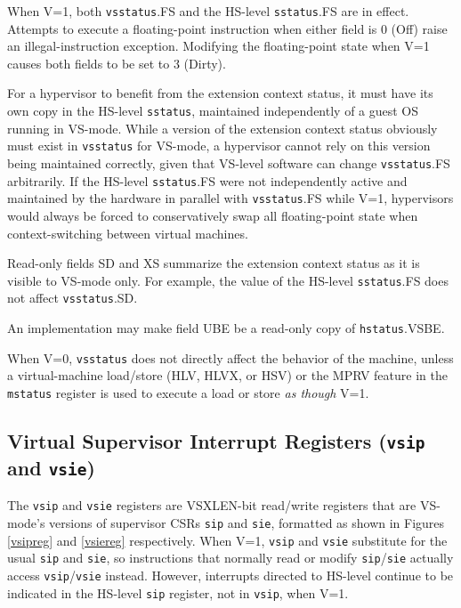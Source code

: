 When V=1, both {\tt vsstatus}.FS and the HS-level {\tt sstatus}.FS are in
effect.  Attempts
to execute a floating-point instruction when either field is 0 (Off) raise an
illegal-instruction exception.  Modifying the floating-point state when V=1
causes both fields to be set to 3 (Dirty).

\begin{commentary}
For a hypervisor to benefit from the extension context status, it must
have its own copy in the HS-level {\tt sstatus}, maintained independently
of a guest OS running in VS-mode.
While a version of the extension context status obviously must exist in
{\tt vsstatus} for VS-mode, a hypervisor cannot rely on this version
being maintained correctly, given that VS-level software can change
{\tt vsstatus}.FS arbitrarily.
If the HS-level {\tt sstatus}.FS were not independently active and
maintained by the hardware in parallel with {\tt vsstatus}.FS while V=1,
hypervisors would always be forced to conservatively swap all
floating-point state when context-switching between virtual machines.
\end{commentary}

Read-only fields SD and XS summarize the extension context status as it
is visible to VS-mode only.
For example, the value of the HS-level {\tt sstatus}.FS does not affect
{\tt vsstatus}.SD.

An implementation may make field UBE be a read-only copy of
{\tt hstatus}.VSBE.

When V=0, {\tt vsstatus} does not directly affect the behavior of the machine,
unless a virtual-machine load/store (HLV, HLVX, or HSV)
or the MPRV feature in the {\tt mstatus}
register is used to execute a load or store
{\em as though} V=1.

\subsection{Virtual Supervisor Interrupt Registers ({\tt vsip} and {\tt vsie})}

The {\tt vsip} and {\tt vsie} registers are VSXLEN-bit read/write
registers that are VS-mode's versions of supervisor CSRs {\tt sip} and
{\tt sie}, formatted as shown in Figures \ref{vsipreg} and \ref{vsiereg}
respectively.
When V=1, {\tt vsip} and {\tt vsie} substitute for the usual {\tt sip}
and {\tt sie}, so instructions that normally read or modify
{\tt sip}/{\tt sie} actually access {\tt vsip}/{\tt vsie} instead.
However, interrupts directed to HS-level continue to be
indicated in the HS-level {\tt sip} register, not in {\tt vsip}, when
V=1.

